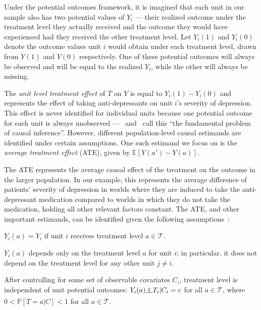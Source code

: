 Under the potential outcomes framework, it is imagined that each unit in our sample also has
two potential values of $Y_{i}$ --- their realized outcome under the treatment level they actually received
and the outcome they would have experienced had they received the other treatment level. Let $Y_{i}(1)$
and $Y_{i}(0)$ denote the outcome values unit $i$ would obtain under each treatment level, drawn from 
$Y(1)$ and $Y(0)$ respectively. One of these
potential outcomes will always be observed and will be equal to the realized $Y_{i}$, while the other
will always be missing. 

The \textit{unit level treatment effect} of $T$ on $Y$ is equal to $Y_{i}(1) - Y_{i}(0)$ and represents 
the effect of taking anti-depressants on unit $i$'s severity of depression. This
effect is never identified for individual units because one potential outcome for each unit is always
unobserved ---~\cite{rubin1974} and~\cite{holland1986} call this ``the fundamental problem of causal 
inference''. However, different population-level causal estimands are identified under certain assumptions. 
One such estimand we focus on is the \textit{average treatment effect} (ATE), given by 
$\mathbb{E}[Y(a') - Y(a)]$.

The ATE represents the average causal effect of the treatment on the outcome in the larger population. In
our example, this represents the average difference of patients' severity of depression in worlds where they 
are induced to take the anti-depressant medication compared to worlds in which they 
do not take the medication, holding all other relevant factors constant. The ATE, and other 
important estimands, can be identified given the following assumptions~\citep{imbens2015}: 

\begin{assumption}[Consistency]\label{assm:Consistency}
$Y_{i}(a) = Y_{i}$ if unit $i$ receives treatment level $a \in \mathcal{T}$. 
\end{assumption}

\begin{assumption}[No interference]\label{assm:no_interference}
$Y_{i}(a)$ depends only on the treatment level $a$ for unit $i$; in particular, it does not depend on 
the treatment level for any other unit $j \neq i$. 
\end{assumption}

\begin{assumption}\label{assm:ignorability} After controlling for some set of 
observable covariates $C_{i}$, treatment level is independent of unit potential 
outcomes: $Y_{i}(a) \indep T_{i} | C_{i} = c$ for all $a \in \mathcal{T}$, where 
$0 < \mathbb{P}[T = a | C] < 1$ for all $a \in \mathcal{T}$. 
\end{assumption}

